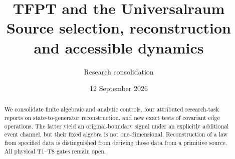 \documentclass[11pt,a4paper]{article}
\title{TFPT and the Universalraum\\Source selection, reconstruction and accessible dynamics}
\author{Research consolidation}
\date{12 September 2026}
\begin{document}
\maketitle
\begin{abstract}
We consolidate finite algebraic and analytic controls, four attributed
research-task reports on state-to-generator reconstruction, and new exact
tests of covariant edge operations. The latter yield an original-boundary
signal under an explicitly additional event channel, but their fixed
algebra is not one-dimensional. Reconstruction of a law from specified
data is distinguished from deriving those data from a primitive source.
All physical T1--T8 gates remain open.
\end{abstract}

\end{document}
